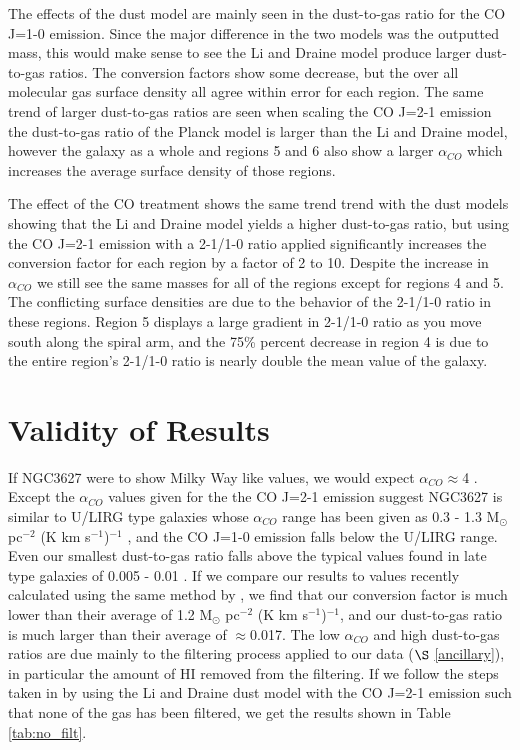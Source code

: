 The effects of the dust model are mainly seen in the dust-to-gas ratio for the CO J=1-0 emission.  Since the major difference in the two models was the outputted mass, this would make sense to see the Li and Draine model produce larger dust-to-gas ratios.  The conversion factors show some decrease, but the over all molecular gas surface density all agree within error for each region.  The same trend of larger dust-to-gas ratios are seen when scaling the CO J=2-1 emission the dust-to-gas ratio of the Planck model is larger than the Li and Draine model, however the galaxy as a whole and regions 5 and 6 also show a larger $\alpha_{CO}$ which increases the average surface density of those regions.
  
The effect of the CO treatment shows the same trend trend with the dust models showing that the Li and Draine model yields a higher dust-to-gas ratio, but using the CO J=2-1 emission with a 2-1/1-0 ratio applied significantly increases the conversion factor for each region by a factor of  2 to 10.  Despite the increase in $\alpha_{CO}$ we still see the same masses for all of the regions except for regions 4 and 5.  The conflicting surface densities are due to the behavior of the 2-1/1-0 ratio in these regions.  Region 5 displays a large gradient in 2-1/1-0 ratio as you move south along the spiral arm, and the 75\% percent decrease in region 4 is due to the entire region's 2-1/1-0 ratio is nearly double the mean value of the galaxy.

\section{Validity of Results}

If NGC3627 were to show Milky Way like values, we would expect $\alpha_{CO}\approx$4 \citep{sandstrom2013}.  Except the $\alpha_{CO}$ values given for the the CO J=2-1 emission suggest  NGC3627 is similar to U/LIRG type galaxies whose $\alpha_{CO}$ range has been given as 0.3 - 1.3 M$_\odot$ pc$^{-2}$ (K km s$^{-1}$)$^{-1}$ \citep{downes1998}, and the CO J=1-0 emission falls below the U/LIRG range.  Even our smallest dust-to-gas ratio falls above the typical values found in late type galaxies of 0.005 - 0.01 \citep{smith2012}.  If we compare our results to values recently calculated using the same method by \cite{sandstrom2013}, we find that our conversion factor is much lower than their average of 1.2 M$_\odot$ pc$^{-2}$ (K km s$^{-1}$)$^{-1}$, and our dust-to-gas ratio is much larger than their average of $\approx$0.017.  The low $\alpha_{CO}$ and high dust-to-gas ratios are due mainly to the filtering process applied to our data ($\S$ \ref{ancillary}), in particular the amount of HI removed from the filtering.  If we follow the steps taken in \cite{sandstrom2013} by using the Li and Draine dust model with the CO J=2-1 emission such that none of the gas has been filtered, we get the results shown in Table \ref{tab:no_filt}.

